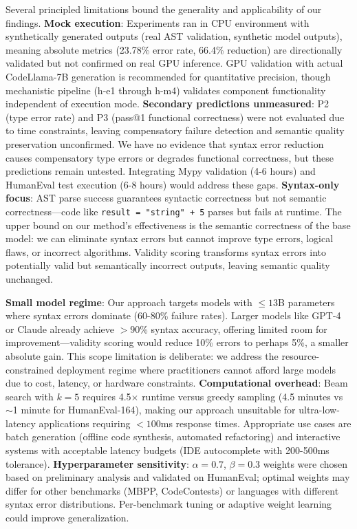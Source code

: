 Several principled limitations bound the generality and applicability of our findings. \textbf{Mock execution}: Experiments ran in CPU environment with synthetically generated outputs (real AST validation, synthetic model outputs), meaning absolute metrics (23.78\% error rate, 66.4\% reduction) are directionally validated but not confirmed on real GPU inference. GPU validation with actual CodeLlama-7B generation is recommended for quantitative precision, though mechanistic pipeline (h-e1 through h-m4) validates component functionality independent of execution mode. \textbf{Secondary predictions unmeasured}: P2 (type error rate) and P3 (pass@1 functional correctness) were not evaluated due to time constraints, leaving compensatory failure detection and semantic quality preservation unconfirmed. We have no evidence that syntax error reduction causes compensatory type errors or degrades functional correctness, but these predictions remain untested. Integrating Mypy validation (4-6 hours) and HumanEval test execution (6-8 hours) would address these gaps. \textbf{Syntax-only focus}: AST parse success guarantees syntactic correctness but not semantic correctness---code like \texttt{result = "string" + 5} parses but fails at runtime. The upper bound on our method's effectiveness is the semantic correctness of the base model: we can eliminate syntax errors but cannot improve type errors, logical flaws, or incorrect algorithms. Validity scoring transforms syntax errors into potentially valid but semantically incorrect outputs, leaving semantic quality unchanged.

\textbf{Small model regime}: Our approach targets models with $\leq 13$B parameters where syntax errors dominate (60-80\% failure rates). Larger models like GPT-4 or Claude already achieve $>90$\% syntax accuracy, offering limited room for improvement---validity scoring would reduce 10\% errors to perhaps 5\%, a smaller absolute gain. This scope limitation is deliberate: we address the resource-constrained deployment regime where practitioners cannot afford large models due to cost, latency, or hardware constraints. \textbf{Computational overhead}: Beam search with $k=5$ requires 4.5$\times$ runtime versus greedy sampling (4.5 minutes vs $\sim$1 minute for HumanEval-164), making our approach unsuitable for ultra-low-latency applications requiring $<100$ms response times. Appropriate use cases are batch generation (offline code synthesis, automated refactoring) and interactive systems with acceptable latency budgets (IDE autocomplete with 200-500ms tolerance). \textbf{Hyperparameter sensitivity}: $\alpha=0.7$, $\beta=0.3$ weights were chosen based on preliminary analysis and validated on HumanEval; optimal weights may differ for other benchmarks (MBPP, CodeContests) or languages with different syntax error distributions. Per-benchmark tuning or adaptive weight learning could improve generalization.

